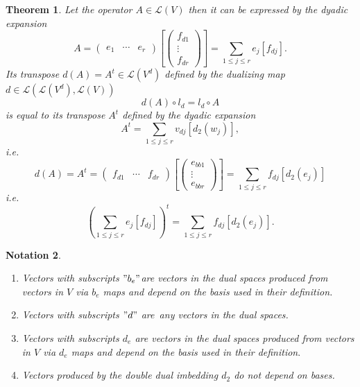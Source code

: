 \documentclass[aps,preprint]{revtex4}
\newtheorem{theorem}{Theorem}
\newtheorem{notation}[theorem]{Notation}
\begin{document}
\begin{theorem}
Let the operator $A\in \mathcal{L}\left( V\right) $ then it can be expressed
by the dyadic expansion 
\begin{equation}
A=\left( 
\begin{array}{ccc}
e_{1} & \cdots & e_{r}%
\end{array}%
\right) \left[ \left( 
\begin{array}{c}
f_{d1} \\ 
\vdots \\ 
f_{dr}%
\end{array}%
\right) \right] =\sum_{1\leq j\leq r}e_{j}\left[ f_{dj}\right] .
\end{equation}%
Its transpose $d\left( A\right) =A^{t}\in \mathcal{L}\left( V^{d}\right) $
defined by the dualizing map $d\in \mathcal{L}\left( \mathcal{L}\left(
V^{d}\right) ,\mathcal{L}\left( V\right) \right) $ 
\begin{equation}
d\left( A\right) \circ l_{d}=l_{d}\circ A
\end{equation}%
is equal to its transpose $A^{t}$ defined by the dyadic expansion 
\begin{equation}
A^{t}=\sum_{1\leq j\leq r}v_{dj}\left[ d_{2}\left( w_{j}\right) \right] ,
\end{equation}
i.e. 
\begin{equation}
d\left( A\right) =A^{t}=\left( 
\begin{array}{ccc}
f_{d1} & \cdots & f_{dr}%
\end{array}%
\right) \left[ \left( 
\begin{array}{c}
e_{bb1} \\ 
\vdots \\ 
e_{bbr}%
\end{array}%
\right) \right] =\sum_{1\leq j\leq r}f_{dj}\left[ d_{2}\left( e_{j}\right) %
\right]
\end{equation}%
i.e. 
\begin{equation}
\left( \sum_{1\leq j\leq r}e_{j}\left[ f_{dj}\right] \right)
^{t}=\sum_{1\leq j\leq r}f_{dj}\left[ d_{2}\left( e_{j}\right) \right] .
\end{equation}
\end{theorem}

\begin{notation}
\begin{enumerate}
\item Vectors with subscripts $"b_{e}"$are vectors in the dual spaces
produced from vectors in $V$ via $b_{e}$ maps and depend on the basis used
in their definition.

\item Vectors with subscripts $"d"$ are\emph{\ any }vectors in the dual
spaces.

\item Vectors with subscripts $d_{e}$ are vectors in the dual spaces
produced from vectors in $V$ via $d_{e}$ maps and depend on the basis used
in their definition$.$

\item Vectors produced by the double dual imbedding $d_{2}$ do not depend on
bases.
\end{enumerate}
\end{notation}
\end{document}

